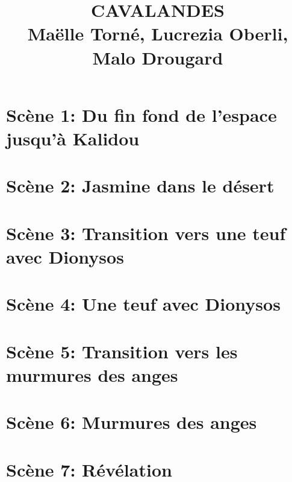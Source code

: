 \documentclass[oneside]{book}
\begin{document}
\title{\uppercase{Cavalandes}\\ \vspace{1em } Maëlle Torné, Lucrezia Oberli, Malo Drougard}
\date{}
\maketitle





\chapter*{Scène 1: Du fin fond de l’espace jusqu’à Kalidou}
{\obeylines %


\chapter*{Scène 2: Jasmine dans le désert}


\chapter*{Scène 3: Transition vers une teuf avec Dionysos}


\chapter*{Scène 4: Une teuf avec Dionysos}


\chapter*{Scène 5: Transition vers les murmures des anges}


\chapter*{Scène 6: Murmures des anges}


\chapter*{Scène 7: Révélation}

}
\end{document}
